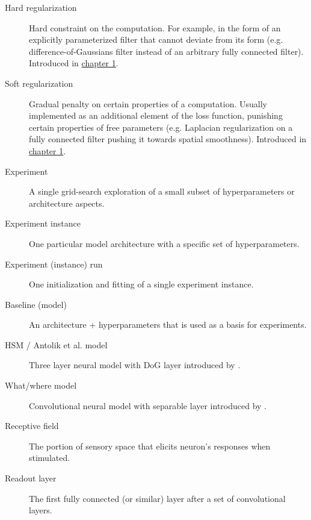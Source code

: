 
\begin{description}
	
	\item[Hard regularization]\label{glos:hard-reg} Hard constraint on the computation. For example, in the form of an explicitly parameterized filter that cannot deviate from its form (e.g. difference-of-Gaussians filter instead of an arbitrary fully connected filter). Introduced in \hyperref[intr:hard-reg]{chapter 1}.
	
	\item[Soft regularization]\label{glos:soft-reg} Gradual penalty on certain properties of a computation. Usually implemented as an additional element of the loss function, punishing certain properties of free parameters (e.g. Laplacian regularization on a fully connected filter pushing it towards spatial smoothness). Introduced in \hyperref[intr:soft-reg]{chapter 1}.
	
	\item[Experiment] A single grid-search exploration of a small subset of hyperparameters or architecture aspects.
	
	\item[Experiment instance] One particular model architecture with a specific set of hyperparameters.
	
	\item[Experiment (instance) run] One initialization and fitting of a single experiment instance.
	
	\item[Baseline (model)] An architecture + hyperparameters that is used as a basis for experiments.
	
	\item[HSM / Antolik et al. model] Three layer neural model with DoG layer introduced by \cite{antolik}.

	\item[What/where model] Convolutional neural model with separable layer introduced by \cite{klidnt}.

	\item[Receptive field] The portion of sensory space that elicits neuron’s responses when stimulated.

	\item[Readout layer] The first fully connected (or similar) layer after a set of convolutional layers.

\end{description}


